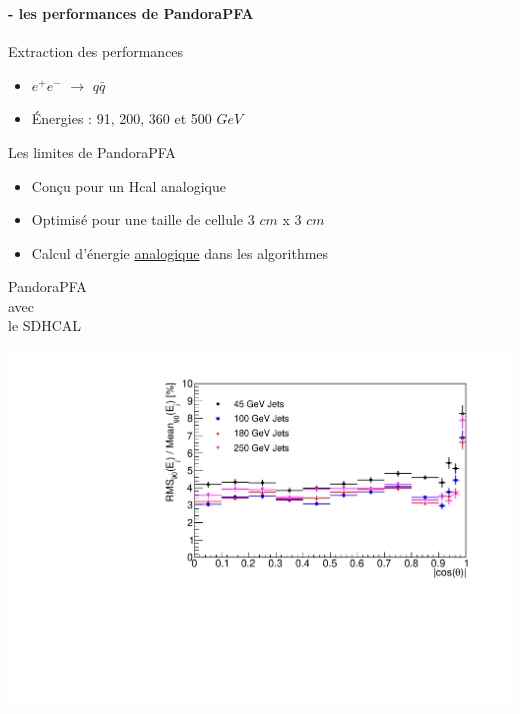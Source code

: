 \documentclass[8pt]{beamer}
\begin{document}
  \begin{frame}
  \frametitle{\secname}
  \framesubtitle{\subsecname - les performances de PandoraPFA}
    \begin{minipage}{0.6\linewidth}
      \begin{block}{Extraction des performances}
        \begin{itemize}
          \item $e^+e^-$ $\rightarrow$ $q\bar{q}$
          \item Énergies : 91, 200, 360 et 500 $GeV$
        \end{itemize}
      \end{block}
      {
      \begin{block}{Les limites de PandoraPFA}
        \begin{itemize}
          \item Conçu pour un Hcal analogique
          \item Optimisé pour une taille de cellule 3 $cm$ x 3 $cm$
          \item Calcul d'énergie \underline{analogique} dans les algorithmes
        \end{itemize}
      \end{block}
      \begin{center}
        \begin{minipage}{0.3\linewidth}
          \begin{center}
            PandoraPFA \\avec \\le SDHCAL
          \end{center}
        \end{minipage} \hfill
        \begin{minipage}{0.68\linewidth}
          \includegraphics[width=\linewidth]{PandoraPFA_JER_ILD_v05_o2.pdf}

\end{minipage}
\end{center}}
\end{minipage}
\end{frame}
\end{document}
